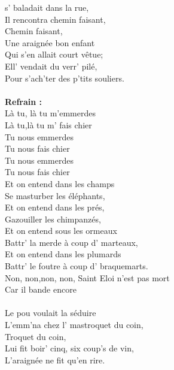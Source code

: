 
 s' baladait dans la rue,
\\Il rencontra chemin faisant,
\\Chemin faisant,
\\Une araignée bon enfant
\\Qui s'en allait court vêtue;
\\Ell' vendait du verr' pilé,
\\Pour s'ach'ter des p'tits souliers.
\\\\\textbf{Refrain :}
\\Là tu, là tu m'emmerdes
\\Là tu,là tu m' fais chier
\\Tu nous emmerdes
\\Tu nous fais chier
\\Tu nous emmerdes
\\Tu nous fais chier
\\Et on entend dans les champs
\\Se masturber les éléphants,
\\Et on entend dans les prés,
\\Gazouiller les chimpanzés,
\\Et on entend sous les ormeaux
\\Battr' la merde à coup d' marteaux,
\\Et on entend dans les plumards
\\Battr' le foutre à coup d' braquemarts.
\\Non, non,non, non, Saint Eloi n'est pas mort \bissimple
\\Car il bande encore \bissimple
\\\\Le pou voulait la séduire
\\L'emm'na chez l' mastroquet du coin,
\\Troquet du coin,
\\Lui fit boir' cinq, six coup's de vin,
\\L'araignée ne fit qu'en rire.
